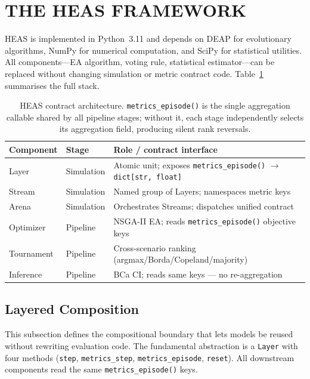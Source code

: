 \documentclass{wscpaperproc}
\begin{document}
\section{THE HEAS FRAMEWORK}

HEAS is implemented in Python~3.11 and depends on DEAP for evolutionary
algorithms, NumPy for numerical computation, and SciPy for statistical
utilities. All components---EA algorithm, voting rule, statistical
estimator---can be replaced without changing simulation or metric contract code.
Table~\ref{tab:architecture} summarises the full stack.

\begin{table}[t]
\centering\footnotesize
\caption{HEAS contract architecture. \texttt{metrics\_episode()} is the single
  aggregation callable shared by all pipeline stages; without it, each stage
  independently selects its aggregation field, producing silent rank reversals.}
\label{tab:architecture}
\setlength{\tabcolsep}{5pt}
\begin{tabular}{@{}llp{5.8cm}@{}}
\toprule
\textbf{Component} & \textbf{Stage} & \textbf{Role / contract interface} \\
\midrule
Layer   & Simulation & Atomic unit; exposes \texttt{metrics\_episode()} $\!\to\!$ \texttt{dict[str,\,float]} \\
Stream  & Simulation & Named group of Layers; namespaces metric keys \\
Arena   & Simulation & Orchestrates Streams; dispatches unified contract \\
\midrule
Optimizer   & Pipeline & NSGA-II EA; reads \texttt{metrics\_episode()} objective keys \\
Tournament  & Pipeline & Cross-scenario ranking (argmax/Borda/Copeland/majority) \\
Inference   & Pipeline & BCa CI; reads same keys --- no re-aggregation \\
\bottomrule
\end{tabular}
\end{table}

\subsection{Layered Composition}

This subsection defines the compositional boundary that lets models be reused
without rewriting evaluation code. The fundamental abstraction is a
\texttt{Layer} with four methods
(\texttt{step}, \texttt{metrics\_step}, \texttt{metrics\_episode},
\texttt{reset}). All downstream components read the same
\texttt{metrics\_episode()} keys.
\end{document}
